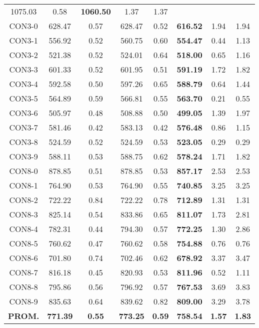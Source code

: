 \begin{table}[ht]
\begin{tabular}{c c c c c c c c}
1075.03 & 0.58 & \bf{1060.50} & 
1.37 & 1.37\\CON3-0 & 628.47 & 0.57 & 
628.47 & 0.52 & \bf{616.52} & 
1.94 & 1.94\\CON3-1 & 556.92 & 0.52 & 
560.75 & 0.60 & \bf{554.47} & 
0.44 & 1.13\\CON3-2 & 521.38 & 0.52 & 
524.01 & 0.64 & \bf{518.00} & 
0.65 & 1.16\\CON3-3 & 601.33 & 0.52 & 
601.95 & 0.51 & \bf{591.19} & 
1.72 & 1.82\\CON3-4 & 592.58 & 0.50 & 
597.26 & 0.65 & \bf{588.79} & 
0.64 & 1.44\\CON3-5 & 564.89 & 0.59 & 
566.81 & 0.55 & \bf{563.70} & 
0.21 & 0.55\\CON3-6 & 505.97 & 0.48 & 
508.88 & 0.50 & \bf{499.05} & 
1.39 & 1.97\\CON3-7 & 581.46 & 0.42 & 
583.13 & 0.42 & \bf{576.48} & 
0.86 & 1.15\\CON3-8 & 524.59 & 0.52 & 
524.59 & 0.53 & \bf{523.05} & 
0.29 & 0.29\\CON3-9 & 588.11 & 0.53 & 
588.75 & 0.62 & \bf{578.24} & 
1.71 & 1.82\\CON8-0 & 878.85 & 0.51 & 
878.85 & 0.53 & \bf{857.17} & 
2.53 & 2.53\\CON8-1 & 764.90 & 0.53 & 
764.90 & 0.55 & \bf{740.85} & 
3.25 & 3.25\\CON8-2 & 722.22 & 0.84 & 
722.22 & 0.78 & \bf{712.89} & 
1.31 & 1.31\\CON8-3 & 825.14 & 0.54 & 
833.86 & 0.65 & \bf{811.07} & 
1.73 & 2.81\\CON8-4 & 782.31 & 0.44 & 
794.30 & 0.57 & \bf{772.25} & 
1.30 & 2.86\\CON8-5 & 760.62 & 0.47 & 
760.62 & 0.58 & \bf{754.88} & 
0.76 & 0.76\\CON8-6 & 701.80 & 0.74 & 
702.46 & 0.62 & \bf{678.92} & 
3.37 & 3.47\\CON8-7 & 816.18 & 0.45 & 
820.93 & 0.53 & \bf{811.96} & 
0.52 & 1.11\\CON8-8 & 795.86 & 0.56 & 
796.92 & 0.57 & \bf{767.53} & 
3.69 & 3.83\\CON8-9 & 835.63 & 0.64 & 
839.62 & 0.82 & \bf{809.00} & 
3.29 & 3.78\\\bf{PROM.} & 
\bf{771.39} & \bf{0.55} & \bf{773.25} & \bf{0.59} & \bf{758.54} & \bf{1.57} & \bf{1.83}\\[1ex]\hline
\end{tabular}
\label{table:nonlin}
\end{table} 
\clearpage

